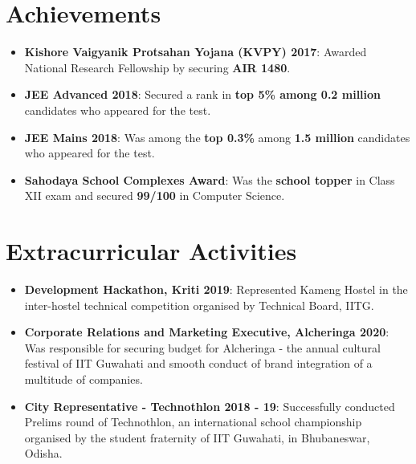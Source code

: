 \documentclass[a4paper,10pt]{report}
\newcommand{\resumeItem}[2]{
  \item\small{
    \textbf{#1}{: #2 \vspace{-2pt}}
  }
}
\newcommand{\resumeSubItem}[2]{\resumeItem{#1}{#2}\vspace{-4pt}}
\newcommand{\resumeSubHeadingListStart}{\begin{itemize}[leftmargin=*]}
\newcommand{\resumeSubHeadingListEnd}{\end{itemize}}
\begin{document}
\vspace{-1pt}
\section{Achievements}
\resumeSubHeadingListStart
\resumeSubItem{Kishore Vaigyanik Protsahan Yojana (KVPY) 2017}{Awarded National Research Fellowship by securing \textbf{AIR 1480}.}
\vspace{2pt}
\resumeSubItem{JEE Advanced 2018}{Secured a rank in \textbf{top 5\% among 0.2 million} candidates who appeared for the test.}
\vspace{2pt}
\resumeSubItem{JEE Mains 2018}{Was among the \textbf{top 0.3\%} among \textbf{1.5 million} candidates who appeared for the test.}
\vspace{2pt}
\resumeSubItem{Sahodaya School Complexes Award}{Was the \textbf{school topper} in Class XII exam and secured \textbf{99/100} in Computer Science.}
\resumeSubHeadingListEnd
 
\vspace{-1pt}
\section{Extracurricular Activities}
\resumeSubHeadingListStart
\resumeSubItem{Development Hackathon, Kriti 2019}{Represented Kameng Hostel in the inter-hostel technical competition organised by Technical Board, IITG.}
\vspace{2pt}
\resumeSubItem{Corporate Relations and Marketing Executive, Alcheringa 2020}{Was responsible for securing budget for Alcheringa - the annual cultural festival of IIT Guwahati and smooth conduct of brand integration of a multitude of companies.}
\vspace{2pt}
\resumeSubItem{City Representative - Technothlon 2018 - 19}{Successfully conducted Prelims round of Technothlon, an international school championship organised by the student fraternity of IIT Guwahati, in Bhubaneswar, Odisha.}
\resumeSubHeadingListEnd

\end{document}
